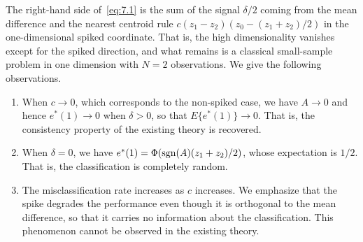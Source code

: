The right-hand side of~\eqref{eq:7.1} is the sum of the signal $\delta/2$ coming
from the mean difference and the nearest centroid rule
$c(z_1-z_2)(z_0-(z_1+z_2)/2)$ in the one-dimensional spiked coordinate. That is,
the high dimensionality vanishes except for the spiked direction, and what remains
is a classical small-sample problem in one dimension with $N=2$ observations. We
give the following observations.

\begin{enumerate}[label=(\roman*)]
\item When $c\to 0$, which corresponds to the non-spiked case, we have $A\to 0$ and
hence $e^*(1)\to 0$ when $\delta>0$, so that $E\{e^*(1)\}\to 0$. That is, the
consistency property of the existing theory is recovered.

\item When $\delta=0$, we have $e^*(1)=\Phi(\operatorname{sgn}(A)(z_1+z_2)/2)$, whose expectation
is $1/2$. That is, the classification is completely random.

\item The misclassification rate increases as $c$ increases. We emphasize that the
spike degrades the performance even though it is orthogonal to the mean difference,
so that it carries no information about the classification. This phenomenon cannot
be observed in the existing theory.
\end{enumerate}
